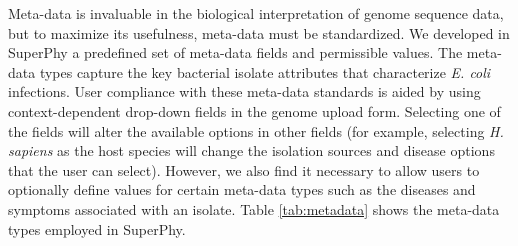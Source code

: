 \documentclass[a4paper,twoside]{article}
\begin{document}
Meta-data is invaluable in the biological interpretation of genome sequence data, but to maximize its usefulness, meta-data must be standardized. We developed in SuperPhy a predefined set of meta-data fields and permissible values. The meta-data types capture the key bacterial isolate attributes that characterize \textit{E. coli} infections. User compliance with these meta-data standards is aided by using context-dependent drop-down fields in the genome upload form. Selecting one of the fields will alter the available options in other fields (for example, selecting \textit{H. sapiens} as the host species will change the isolation sources and disease options that the user can select).  However, we also find it necessary to allow users to optionally define values for certain meta-data types such as the diseases and symptoms associated with an isolate. Table \ref{tab:metadata} shows the meta-data types employed in SuperPhy.
\end{document}

